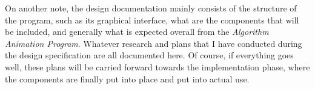 On another note, the design documentation mainly consists of the structure of the program, such as its graphical interface, what are the components that will be included, and generally what is expected overall from the \textit{Algorithm Animation Program}. Whatever research and plans that I have conducted during the design specification are all documented here. Of course, if everything goes well, these plans will be carried forward towards the implementation phase, where the components are finally put into place and put into actual use. 

